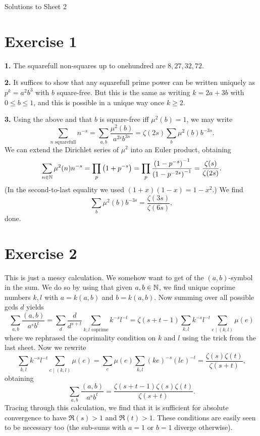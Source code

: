 \documentclass[a4paper,11pt]{article}
\begin{document}
\begin{center}
    \huge{Solutions to Sheet 2}
\end{center}

\section*{Exercise 1}
\textbf{1.} The squarefull non-squares up to onehundred are $8,27,32,72$.

\textbf{2.} It suffices to show that any squarefull prime power can be written uniquely as
$p^k = a^2 b^3$ with $b$ square-free. But this is the same as writing $k =
2a+3b$ with $0 \leq b \leq 1$, and this is possible in a unique way once $k \geq 2$. 

\textbf{3.} Using the above and that $b$ is square-free iff $\mu^2(b) = 1$, we may write
\[
    \sum_{n \text{ squarefull}} n^{-s} = \sum_{a,b} \frac{\mu^2(b)}{a^{2s} b^{3s}} = \zeta(2s) \sum_{b} \mu^2(b) b^{-3s}.
\]
We can extend the Dirichlet series of $\mu^2$ into an Euler product, obtaining
\[
    \sum_{n \in \mathbb{N}} \mu^2(n)n^{-s} = \prod_p \left(1 + p^{-s} \right) = \prod_p
    \frac {\left(1 - p^{-s}\right)^{-1}} {\left(1 - p^{-2s}\right)^{-1}} =
    \frac {\zeta(s)}{\zeta(2s)}.
\]
(In the second-to-last equality we used $(1+x)(1-x) = 1-x^2$.)
We find 
\[
    \sum_{b} \mu^2(b) b^{-3s} = \frac{\zeta(3s) }{\zeta(6s)},
\]
done.

\section*{Exercise 2}
This is just a messy calculation. 
We somehow want to get of the $(a,b)$-symbol in the sum. We do so by using that
given $a,b \in \mathbb{N}$, we find unique coprime numbers $k, l$ with $a = k (a,b)$ and 
$b = k (a,b)$. Now summing over all possible gcds $d$ yields
\[
    \sum_{a,b} \frac{(a,b)}{a^s b^t} = \sum_{d} \frac d{d^{s+t}} \sum_{k,l
    \text{ coprime}} k^{-s}l^{-t} = \zeta(s+t-1)\sum_{k,l} k^{-s}l^{-t} \sum_{e \mid (k,l)} \mu(e)
\]
where we rephrased the coprimality condition on $k$ and $l$ using the trick
from the last sheet.
Now we rewrite
\[
    \sum_{k,l} k^{-s}l^{-t} \sum_{e \mid (k,l)} \mu(e) = \sum_e \mu(e)
    \sum_{k,l} (ke)^{-s} (le)^{-t} = \frac{\zeta(s)\zeta(t)}{\zeta(s+t)},
\]
obtaining
\[
    \sum_{a,b} \frac{(a,b)}{a^s b^t} = \frac {\zeta(s+t-1) \zeta(s) \zeta(t)}{\zeta(s+t)}.
\]
Tracing through this calculation, we find that it is sufficient for absolute convergence to have
$\Re(s)>1$ and $\Re(t) > 1$. These conditions are easily seen to be necessary too (the sub-sums with 
$a=1$ or $b=1$ diverge otherwise).
\end{document}
